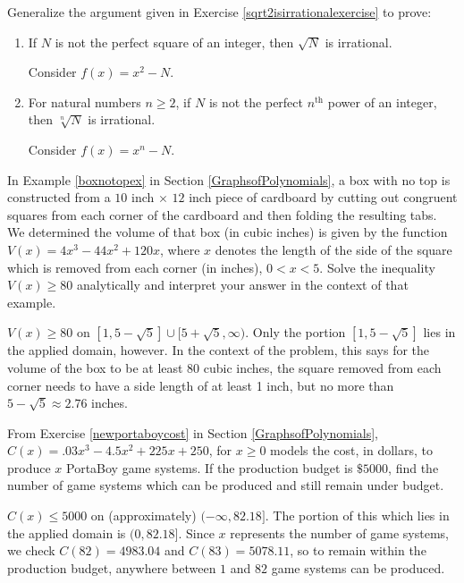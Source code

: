 \documentclass{ximera}
\begin{document}
\begin{problem}
Generalize the argument given in Exercise \ref{sqrt2isirrationalexercise} to prove:

\begin{enumerate}

\item If $N$ is not the perfect square of an integer, then $\sqrt{N}$ is irrational.
\begin{hint}
Consider $f(x) = x^2-N$.
\end{hint}

\item  For natural numbers $n \geq 2$, if $N$ is not the perfect $n^{\text{th}}$ power of an integer, then $\sqrt[n]{N}$ is irrational.
\begin{hint}
Consider $f(x) = x^n-N$.
\end{hint}

\end{enumerate}
\end{problem}

\begin{problem}
In Example \ref{boxnotopex} in Section \ref{GraphsofPolynomials}, a box with no top is constructed from a $10$ inch $\times$ $12$ inch piece of cardboard by cutting out congruent squares from each corner of the cardboard and then folding the resulting tabs.  We determined the volume of that box (in cubic inches) is given by  the function$V(x) = 4x^3-44x^2+120x$, where $x$ denotes the length of the side of the square which is removed from each corner (in inches), $0 < x < 5$.  Solve the inequality $V(x) \geq 80$ analytically and interpret your answer in the context of that example. 

\begin{solution}
     $V(x) \geq 80$ on $[1,5-\sqrt{5}] \cup [5+\sqrt{5}, \infty)$.  Only the portion $[1,5-\sqrt{5}]$ lies in the applied domain, however.   In the context of the problem, this says for the volume of the box to be at least 80 cubic inches, the square removed from each corner needs to have a side length of at least 1 inch, but no more than $5-\sqrt{5} \approx 2.76$ inches.
\end{solution}
\end{problem}

\begin{problem}
From Exercise \ref{newportaboycost} in Section \ref{GraphsofPolynomials}, $C(x) = .03x^{3} - 4.5x^{2} + 225x + 250$, for $x \geq 0$ models the cost, in dollars, to produce $x$ PortaBoy game systems. If the production budget is $\$5000$, find the number of game systems which can be produced and still remain under budget.

\begin{solution}
    $C(x) \leq 5000$ on (approximately) $(-\infty, 82.18]$.  The portion of this which lies in the applied domain is $(0,82.18]$.  Since $x$ represents the number of game systems, we check $C(82) = 4983.04$ and $C(83) = 5078.11$, so to remain within the production budget, anywhere between $1$ and $82$ game systems can be produced.
\end{solution}
\end{problem}
\end{document}
